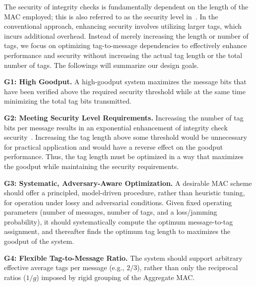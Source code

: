 The security of integrity checks is fundamentally dependent on the length of the MAC employed; this is also referred to as the security level in~\cite{ProMAC1}. In the conventional approach, enhancing security involves utilizing larger tags, which incurs additional overhead. Instead of merely increasing the length or number of tags, we focus on optimizing tag-to-message dependencies to effectively enhance performance and security without increasing the actual tag length or the total number of tags. The followings will summarize our design goals.

\noindent\textbf{G1: High Goodput.}  A high-goodput system maximizes the message bits that have been verified above the required security threshold while at the same time minimizing the total tag bits transmitted.

\noindent\textbf{G2: Meeting Security Level Requirements.} Increasing the number of tag bits per message results in an exponential enhancement of integrity check security~\cite{ProMAC1}. Increasing the tag length above some threshold would be unnecessary for practical application and would have a reverse effect on the goodput performance. Thus, the tag length must be optimized in a way that maximizes the goodput while maintaining the security requirements. 


\noindent\textbf{G3: Systematic, Adversary-Aware Optimization.}
A desirable MAC scheme should offer a principled, model-driven procedure, rather than heuristic tuning, for operation under lossy and adversarial conditions. Given fixed operating parameters (number of messages, number of tags, and a loss/jamming probability), it should systematically compute the optimum message-to-tag assignment, and thereafter finds the optimum tag length to maximizes the goodput of the system.


\noindent\textbf{G4: Flexible Tag-to-Message Ratio.} 
The system should support arbitrary effective average tags per message (e.g., $2/3$), rather than only the reciprocal ratios ($1/g$) imposed by rigid grouping of the Aggregate MAC.




